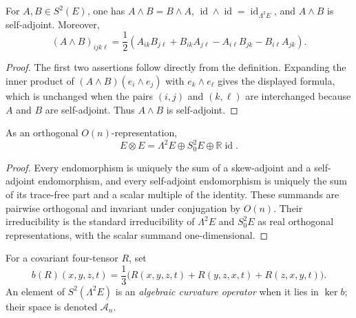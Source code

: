 \begin{lemma}
  \label{lem:chow-ii-symmetric-wedge-properties}
  For \(A,B\in S^2(E)\), one has \(A\wedge B=B\wedge A\),
  \(\operatorname{id}\wedge\operatorname{id}=\operatorname{id}_{\Lambda^2E}\),
  and \(A\wedge B\) is self-adjoint.  Moreover,
  \[
  (A\wedge B)_{ijk\ell}
   =\frac12(A_{ik}B_{j\ell}+B_{ik}A_{j\ell}
                 -A_{i\ell}B_{jk}-B_{i\ell}A_{jk}).
  \]
\end{lemma}
\begin{proof}
  The first two assertions follow directly from the definition.  Expanding
  the inner product of \((A\wedge B)(e_i\wedge e_j)\) with
  \(e_k\wedge e_\ell\) gives the displayed formula, which is unchanged when
  the pairs \((i,j)\) and \((k,\ell)\) are interchanged because \(A\) and
  \(B\) are self-adjoint.  Thus \(A\wedge B\) is self-adjoint.
\end{proof}

\begin{proposition}
  \label{prop:chow-ii-two-tensor-decomposition}
  As an orthogonal \(O(n)\)-representation,
  \[
    E\otimes E=\Lambda^2E\oplus S^2_0E\oplus\mathbb R\operatorname{id}.
  \]
\end{proposition}
\begin{proof}
  Every endomorphism is uniquely the sum of a skew-adjoint and a
  self-adjoint endomorphism, and every self-adjoint endomorphism is uniquely
  the sum of its trace-free part and a scalar multiple of the identity.
  These summands are pairwise orthogonal and invariant under conjugation by
  \(O(n)\).  Their irreducibility is the standard irreducibility of
  \(\Lambda^2E\) and \(S^2_0E\) as real orthogonal representations, with the
  scalar summand one-dimensional.
\end{proof}

\begin{definition}
  \label{def:chow-ii-bianchi-map}
  For a covariant four-tensor \(R\), set
  \[
    b(R)(x,y,z,t)=\frac13\bigl(R(x,y,z,t)+R(y,z,x,t)+R(z,x,y,t)\bigr).
  \]
  An element of \(S^2(\Lambda^2E)\) is an \emph{algebraic curvature
  operator} when it lies in \(\ker b\); their space is denoted \(\mathcal A_n\).
\end{definition}

